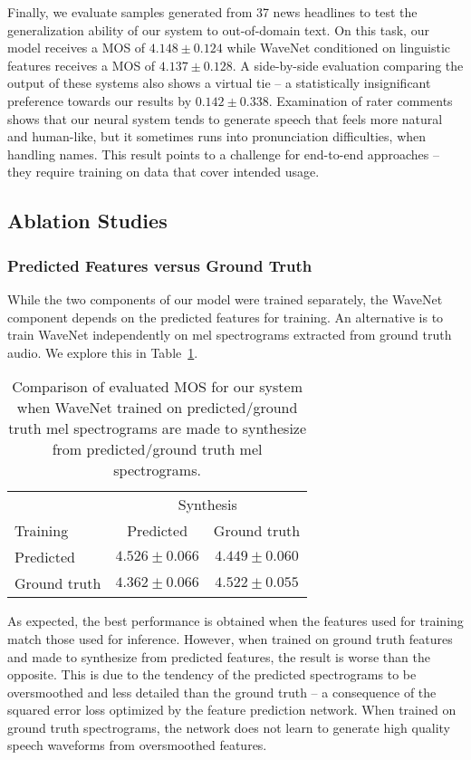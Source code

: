 Finally, we evaluate samples generated from 37 news headlines to test the
generalization ability of our system to out-of-domain text. On this task, our
model receives a MOS of $4.148 \pm 0.124$ while WaveNet conditioned on
linguistic features receives a MOS of $4.137 \pm 0.128$.
A side-by-side evaluation comparing the output of these systems also
shows a virtual tie -- a statistically insignificant preference towards our
results by $0.142 \pm 0.338$. Examination of rater comments shows that our
neural system tends to generate speech that feels more natural and human-like,
but it sometimes runs into pronunciation difficulties, \eg when
handling names. This result points to a challenge for end-to-end
approaches -- they require training on data that cover intended usage.

\subsection{Ablation Studies}
\label{sec:ablation}

\subsubsection{Predicted Features versus Ground Truth}
\label{ssec:gtfeats}

While the two components of our model were trained separately, the WaveNet component
depends on the predicted features for training. An alternative
is to train WaveNet independently on mel spectrograms extracted from ground
truth audio. We explore this in Table~\ref{tbl:pred_gt}.

\begin{table}[H]
  \centering
  \begin{tabular}{lcc}
    \toprule
                 & \multicolumn{2}{c}{Synthesis}\\
    Training     & Predicted         & Ground truth \\
    \midrule
    Predicted    & $4.526 \pm 0.066$ & $4.449 \pm 0.060$ \\
    Ground truth & $4.362 \pm 0.066$ & $4.522 \pm 0.055$ \\
    \bottomrule
  \end{tabular}
\caption{Comparison of evaluated MOS for our system when WaveNet trained on
predicted/ground truth mel spectrograms are made to synthesize from
predicted/ground truth mel spectrograms.}
\label{tbl:pred_gt}
\end{table}

As expected, the best performance is obtained when the features used for
training match those used for inference. However, when trained on
ground truth features and made to synthesize from
predicted features, the result is worse than the opposite.
This is due to the tendency of the predicted spectrograms to be oversmoothed and less
detailed than the ground truth -- a consequence of the squared error loss
optimized by the feature prediction network. When trained on ground truth
spectrograms, the network does not learn to generate high quality speech
waveforms from oversmoothed features.


